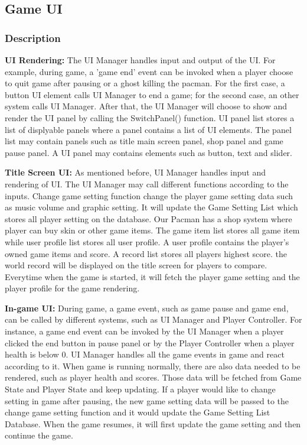 \documentclass[11pt]{article}
\begin{document}
\subsection{Game UI}
\subsubsection{Description}
\textbf{UI Rendering:} The UI Manager handles input and output of the UI. For example, during game, a 'game end' event can be invoked when a player choose to quit game after pausing or a ghost killing the pacman. For the first case, a button UI element calls UI Manager to end a game; for the second case, an other system calls UI Manager. After that, the UI Manager will choose to show and render the UI panel by calling the SwitchPanel() function. UI panel list stores a list of displyable panels where a panel contains a list of UI elements. The panel list may contain panels such as title main screen panel, shop panel and game pause panel. A UI panel may contains elements such as button, text and slider.

\textbf{Title Screen UI:} As mentioned before, UI Manager handles input and rendering of UI. The UI Manager may call different functions according to the inputs. Change game setting function change the player game setting data such as music volume and graphic setting. It will update the Game Setting List which stores all player setting on the database. Our Pacman has a shop system where player can buy skin or other game items. The game item list stores all game item while user profile list stores all user profile. A user profile contains the player's owned game items and score. A record list stores all players highest score. the world record will be displayed on the title screen for players to compare. Everytime when the game is started, it will fetch the player game setting and the player profile for the game rendering.

\textbf{In-game UI:} During game, a game event, such as game pause and game end, can be called by different systems, such as UI Manager and Player Controller. For instance, a game end event can be invoked by the UI Manager when a player clicked the end button in pause panel or by the Player Controller when a player health is below 0. UI Manager handles all the game events in game and react according to it. When game is running normally, there are also data needed to be rendered, such as player health and scores. Those data will be fetched from Game State and Player State and keep updating. If a player would like to change setting in game after pausing, the new game setting data will be passed to the change game setting function and it would update the Game Setting List Database. When the game resumes, it will first update the game setting and then continue the game.
\end{document}
